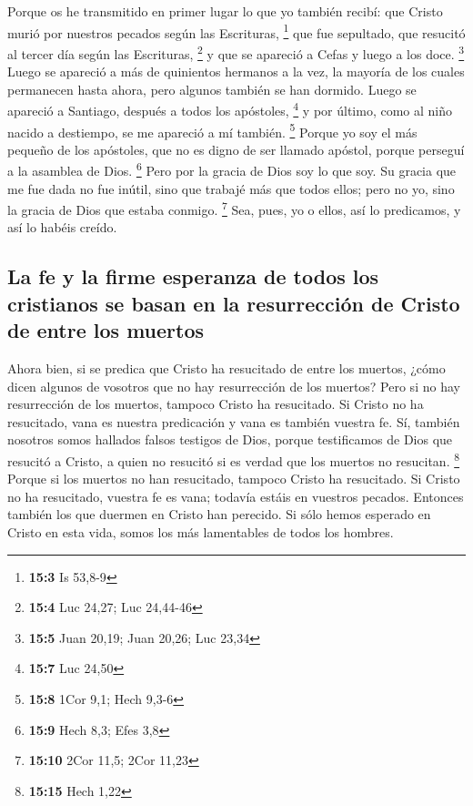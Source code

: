  Porque os he transmitido en primer lugar lo que yo
también recibí: que Cristo murió por nuestros pecados según las
Escrituras, \footnote{\textbf{15:3} Is 53,8-9}  que fue
sepultado, que resucitó al tercer día según las Escrituras, \footnote{\textbf{15:4}
  Luc 24,27; Luc 24,44-46}  y que se apareció a Cefas y
luego a los doce. \footnote{\textbf{15:5} Juan 20,19; Juan 20,26; Luc
  23,34}  Luego se apareció a más de quinientos hermanos a
la vez, la mayoría de los cuales permanecen hasta ahora, pero algunos
también se han dormido.  Luego se apareció a Santiago,
después a todos los apóstoles, \footnote{\textbf{15:7} Luc 24,50}
 y por último, como al niño nacido a destiempo, se me
apareció a mí también. \footnote{\textbf{15:8} 1Cor 9,1; Hech 9,3-6}
 Porque yo soy el más pequeño de los apóstoles, que no es
digno de ser llamado apóstol, porque perseguí a la asamblea de Dios.
\footnote{\textbf{15:9} Hech 8,3; Efes 3,8}  Pero por la
gracia de Dios soy lo que soy. Su gracia que me fue dada no fue inútil,
sino que trabajé más que todos ellos; pero no yo, sino la gracia de Dios
que estaba conmigo. \footnote{\textbf{15:10} 2Cor 11,5; 2Cor 11,23}
 Sea, pues, yo o ellos, así lo predicamos, y así lo
habéis creído.

\hypertarget{la-fe-y-la-firme-esperanza-de-todos-los-cristianos-se-basan-en-la-resurrecciuxf3n-de-cristo-de-entre-los-muertos}{%
\subsection{La fe y la firme esperanza de todos los cristianos se basan
en la resurrección de Cristo de entre los
muertos}\label{la-fe-y-la-firme-esperanza-de-todos-los-cristianos-se-basan-en-la-resurrecciuxf3n-de-cristo-de-entre-los-muertos}}

 Ahora bien, si se predica que Cristo ha resucitado de
entre los muertos, ¿cómo dicen algunos de vosotros que no hay
resurrección de los muertos?  Pero si no hay resurrección
de los muertos, tampoco Cristo ha resucitado.  Si Cristo
no ha resucitado, vana es nuestra predicación y vana es también vuestra
fe.  Sí, también nosotros somos hallados falsos testigos
de Dios, porque testificamos de Dios que resucitó a Cristo, a quien no
resucitó si es verdad que los muertos no resucitan. \footnote{\textbf{15:15}
  Hech 1,22}  Porque si los muertos no han resucitado,
tampoco Cristo ha resucitado.  Si Cristo no ha
resucitado, vuestra fe es vana; todavía estáis en vuestros pecados.
 Entonces también los que duermen en Cristo han perecido.
 Si sólo hemos esperado en Cristo en esta vida, somos los
más lamentables de todos los hombres.

